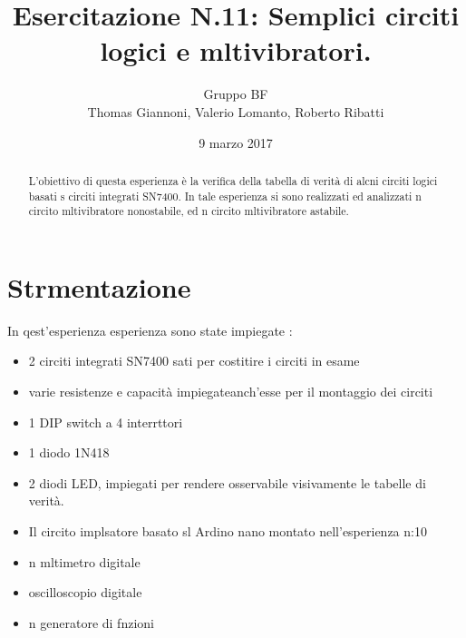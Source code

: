 \documentclass[a4paper,11pt]{article}
\author{Gruppo BF \\ Thomas Giannoni, Valerio Lomanto, Roberto Ribatti}
\title{Esercitazione N.11: Semplici circiti logici e mltivibratori.}
\date{9 marzo 2017}
\begin{document}
\maketitle
\begin{abstract}
	L'obiettivo di questa esperienza è la verifica della tabella di verità di alcni circiti logici basati s circiti integrati SN7400.
	In tale esperienza si sono realizzati ed analizzati n circito mltivibratore nonostabile, ed n circito mltivibratore astabile.


\end{abstract}

\section{Strmentazione}
In qest'esperienza esperienza sono state impiegate :
\begin{itemize}
	\item 2 circiti integrati SN7400 sati per costitire i circiti in esame
	\item varie resistenze e capacità impiegateanch'esse per il montaggio dei circiti
	\item 1 DIP switch a 4 interrttori
	\item 1 diodo 1N418
	\item 2 diodi LED, impiegati per rendere osservabile visivamente le tabelle di verità. 
	\item Il circito implsatore basato sl Ardino nano montato nell'esperienza n:10
	\item n mltimetro digitale
	\item oscilloscopio digitale 
	\item n generatore di fnzioni
\end{itemize}
\end{document}
